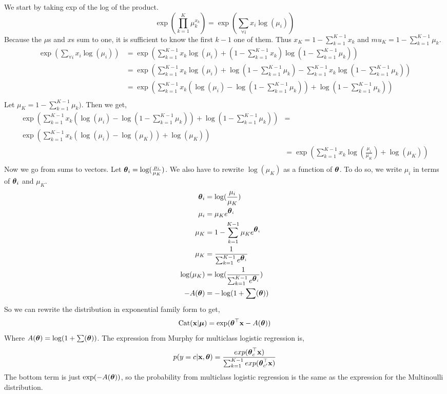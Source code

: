 \documentclass[12pt,letterpaper,fleqn]{hmcpset}
\begin{document}
We start by taking exp of the log of the product.
    $$\exp(\prod_{k=1}^K \mu_k^{x_k}) = \exp(\sum_{\forall i} x_i \log(\mu_i))$$
Because the $\mu$s and $x$s sum to one, it is sufficient to know the first $k-1$ one of them. Thus $x_K = 1 - \sum_{k=1}^{K-1}x_k$ and $mu_K = 1 - \sum_{k=1}^{K-1}\mu_k$.
\begin{align*}
    \exp(\sum_{\forall i} x_i \log(\mu_i))&= \exp(\sum_{k=1}^{K-1}x_k \log(\mu_i) + (1 - \sum_{k=1}^{K-1}x_k)\log( 1 - \sum_{k=1}^{K-1}\mu_k)) \\
    &= \exp(\sum_{k=1}^{K-1}x_k \log(\mu_i) + \log( 1 - \sum_{k=1}^{K-1}\mu_k) - \sum_{k=1}^{K-1}x_k\log( 1 - \sum_{k=1}^{K-1}\mu_k))\\
    &= \exp(\sum_{k=1}^{K-1}x_k (\log(\mu_i)-\log( 1 - \sum_{k=1}^{K-1}\mu_k)) + \log( 1 - \sum_{k=1}^{K-1}\mu_k))\\
\end{align*}
Let $\mu_K = 1 - \sum_{k=1}^{K-1}\mu_k)$. Then we get,
\begin{align*}
    \exp(\sum_{k=1}^{K-1}x_k (\log(\mu_i)-\log( 1 - \sum_{k=1}^{K-1}\mu_k)) + \log( 1 - \sum_{k=1}^{K-1}\mu_k)) &=\\ \exp(\sum_{k=1}^{K-1}x_k (\log(\mu_i)-\log(\mu_K)) + \log(\mu_K))\\
    &= \exp(\sum_{k=1}^{K-1}x_k \log(\frac{\mu_i}{\mu_K})+ \log(\mu_K))\\
\end{align*}
Now we go from sums to vectors. Let $\hbox{\boldmath$\theta$}_i = \log(\frac{\mu_i}{\mu_K})$. We also have to rewrite $\log(\mu_K)$ as a function of $\hbox{\boldmath$\theta$}$. To do so, we write $\mu_i$ in terms of $\hbox{\boldmath$\theta$}_i$ and $\mu_K$. 
   \begin{align*}
       \hbox{\boldmath$\theta$}_i &= \log(\frac{\mu_i}{\mu_K})\\
       \mu_i &= \mu_K e^{\hbox{\boldmath$\theta$}_i}\\
       \mu_K &= 1 - \sum_{k=1}^{K-1} \mu_K e^{\hbox{\boldmath$\theta$}_i} \\
       \mu_K &= \frac{1}{\sum_{k=1}^{K-1} e^{\hbox{\boldmath$\theta$}_i}} \\
       \log(\mu_K) &= \log(\frac{1}{\sum_{k=1}^{K-1} e^{\hbox{\boldmath$\theta$}_i}}) \\
       -A(\hbox{\boldmath$\theta$}) &= -\log(1 + \sum(\hbox{\boldmath$\theta$})) \\
   \end{align*}
So we can rewrite the distribution in exponential family form to get,
$$\text{Cat}({\bf x}|\hbox{\boldmath$\mu$}) = \exp(\hbox{\boldmath$\theta$}^\top {\bf x} - A(\hbox{\boldmath$\theta$}))$$
Where $A(\hbox{\boldmath$\theta$}) = \log(1 + \sum(\hbox{\boldmath$\theta$}))$. The expression from Murphy for multiclass logistic regression is,
        $$p(y=c|{\bf x},\hbox{\boldmath$\theta$}) = \frac{exp(\hbox{\boldmath$\theta$}_{c}^{\top} {\bf x})}{\sum_{k=1}^{K-1} exp(\hbox{\boldmath$\theta$}_{c'}^\top {\bf x})} $$ 
The bottom term is just $\exp(-A(\hbox{\boldmath$\theta$}))$, so the probability from multiclass logistic regression is the same as the expression for the Multinoulli distribution.
\end{document}
